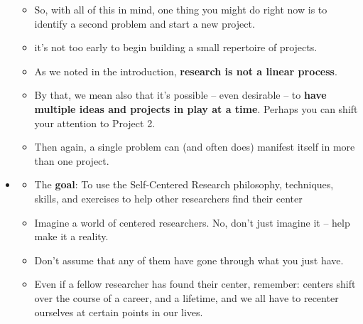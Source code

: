 \documentclass[11pt]{article}
\begin{document}
\begin{itemize}
\begin{exercise}
\begin{itemize}
\item So, with all of this in mind, one thing you might do right now is to identify a second problem and start a new project.

\item it’s not too early to begin building a small repertoire of projects.

\item As we noted in the introduction, \textbf{research is not a linear process}. 

\item By that, we mean also that it’s possible -- even desirable -- to \textbf{have multiple ideas and projects in play at a time}.  Perhaps you can shift your attention to Project 2. 

\item Then again, a single problem can (and often does) manifest itself in more than one project. 
\end{itemize}
\end{exercise}

\item \begin{exercise}
\begin{itemize}
\item The \textbf{goal}: To use the Self-Centered Research philosophy, techniques, skills, and exercises to help other researchers find their center

\item Imagine a world of centered researchers. No, don’t just imagine it -- help make it a reality.

\item Don’t assume that any of them have gone through what you just have. 

\item Even if a fellow researcher has found their center, remember: centers shift over the course of a career, and a lifetime, and we all have to recenter ourselves at certain points in our lives.
\end{itemize}
\end{exercise}
\end{itemize}


\newpage


\end{document}
